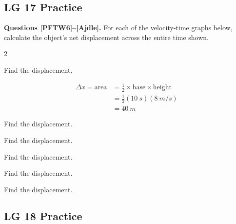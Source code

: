 \documentclass[answers]{exam}
\begin{document}
\clearpage

\subsection*{LG 17 Practice}

\textbf{Questions \ref{PFTW6}--\ref{Ajdle}.} For each of the velocity-time graphs below, calculate the object's net displacement across the entire time shown.


\begin{questions}
\begin{multicols}{2}

\question \label{PFTW6}
Find the displacement.


\begin{solution}

\begin{align*}
    \Delta x = \text{area} &= \frac{1}{2} \times \text{base} \times \text{height} \\[1ex]
    &= \frac{1}{2} (\SI{10}{s})(\SI{8}{m/s}) \\[1ex]
    &= \boxed{\SI{40}{m}}
\end{align*}
\end{solution}

\question
Find the displacement.


\question
Find the displacement.


\question
Find the displacement.


\question
Find the displacement.



\question \label{Ajdle}
Find the displacement.


\end{multicols}
\end{questions}

\clearpage

\subsection*{LG 18 Practice}
\end{document}

